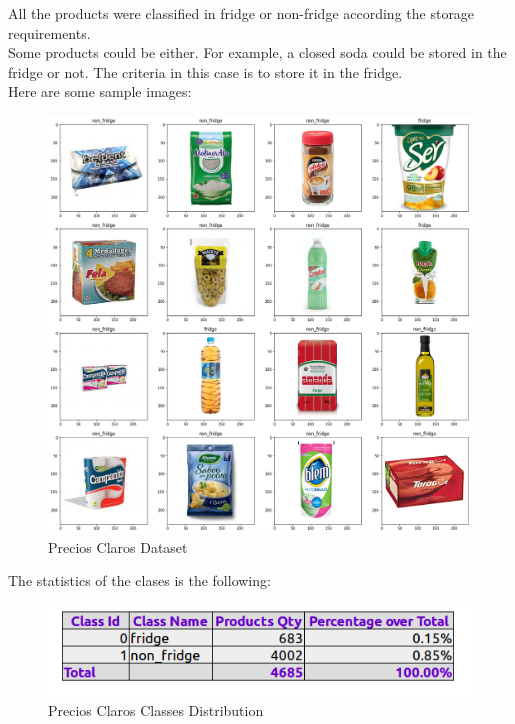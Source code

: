 \documentclass[a4paper,10pt]{article}
\begin{document}
All the products were classified in fridge or non-fridge according the storage requirements.\\

Some products could be either. For example, a closed soda could be stored in the fridge or not. The criteria in this case is to store it in the fridge. \\

Here are some sample images:

\begin{figure}[ht]
  \includegraphics[width=\linewidth]{products2.png}
  \caption{Precios Claros Dataset}
\end{figure}

\newpage

The statistics of the clases is the following:

\begin{figure}[ht]
  \includegraphics[width=\linewidth]{classes_distribution.png}
  \caption{Precios Claros Classes Distribution}
\end{figure}
\end{document}
